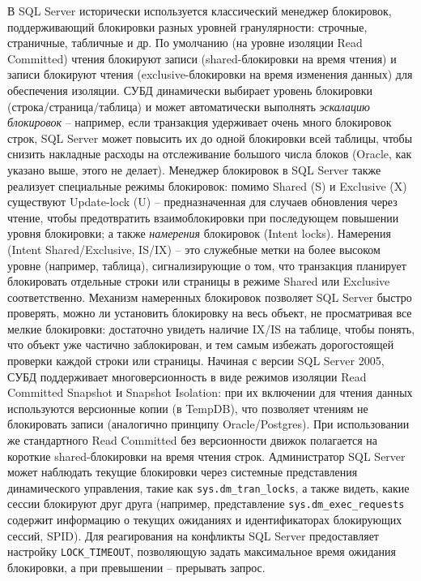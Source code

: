 \begin{itemize}
   В SQL Server исторически используется классический менеджер блокировок, поддерживающий блокировки разных уровней гранулярности: строчные, страничные, табличные и др. По умолчанию (на уровне изоляции Read Committed) чтения блокируют записи (shared-блокировки на время чтения) и записи блокируют чтения (exclusive-блокировки на время изменения данных) для обеспечения изоляции. СУБД динамически выбирает уровень блокировки (строка/страница/таблица) и может автоматически выполнять \textit{эскалацию блокировок} – например, если транзакция удерживает очень много блокировок строк, SQL Server может повысить их до одной блокировки всей таблицы, чтобы снизить накладные расходы на отслеживание большого числа блоков (Oracle, как указано выше, этого не делает). Менеджер блокировок в SQL Server также реализует специальные режимы блокировок: помимо Shared (S) и Exclusive (X) существуют Update-lock (U) – предназначенная для случаев обновления через чтение, чтобы предотвратить взаимоблокировки при последующем повышении уровня блокировки; а также \textit{намерения} блокировок (Intent locks). Намерения (Intent Shared/Exclusive, IS/IX) – это служебные метки на более высоком уровне (например, таблица), сигнализирующие о том, что транзакция планирует блокировать отдельные строки или страницы в режиме Shared или Exclusive соответственно. Механизм намеренных блокировок позволяет SQL Server быстро проверять, можно ли установить блокировку на весь объект, не просматривая все мелкие блокировки: достаточно увидеть наличие IX/IS на таблице, чтобы понять, что объект уже частично заблокирован, и тем самым избежать дорогостоящей проверки каждой строки или страницы. Начиная с версии SQL Server 2005, СУБД поддерживает многоверсионность в виде режимов изоляции Read Committed Snapshot и Snapshot Isolation: при их включении для чтения данных используются версионные копии (в TempDB), что позволяет чтениям не блокировать записи (аналогично принципу Oracle/Postgres). При использовании же стандартного Read Committed без версионности движок полагается на короткие shared-блокировки на время чтения строк. Администратор SQL Server может наблюдать текущие блокировки через системные представления динамического управления, такие как \texttt{sys.dm\_tran\_locks}, а также видеть, какие сессии блокируют друг друга (например, представление \texttt{sys.dm\_exec\_requests} содержит информацию о текущих ожиданиях и идентификаторах блокирующих сессий, SPID). Для реагирования на конфликты SQL Server предоставляет настройку \texttt{LOCK\_TIMEOUT}, позволяющую задать максимальное время ожидания блокировки, а при превышении – прерывать запрос.

\end{itemize}
